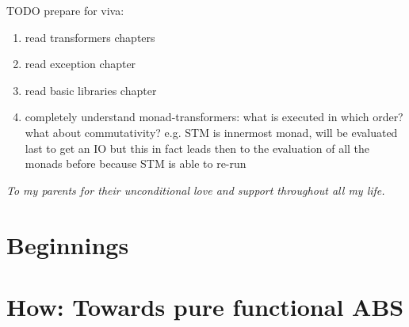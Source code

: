 \documentclass[oneside]{book}
\begin{document}
TODO prepare for viva:
\begin{enumerate}
	\item read transformers chapters
	
	\item read exception chapter

	\item read basic libraries chapter	
	
	\item completely understand monad-transformers: what is executed in which order? what about commutativity? e.g. STM is innermost monad, will be evaluated last to get an IO but this in fact leads then to the evaluation of all the monads before because STM is able to re-run
\end{enumerate}


\clearpage
\tableofcontents
\clearpage
\textit{To my parents for their unconditional love and support throughout all my life.}
\clearpage



\epigraphhead[450]{}
\part{Beginnings}









\epigraphhead[450]{}
\part{How: Towards pure functional ABS}

\end{document}
